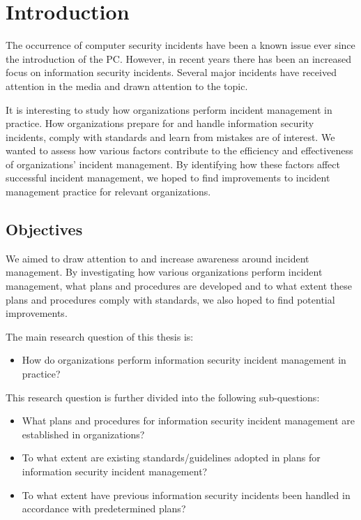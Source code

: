 \chapter{Introduction}
\label{chp:introduction}
The occurrence of computer security incidents have been a known issue ever since the introduction of the PC. However, in recent years there has been an increased focus on information security incidents. Several major incidents have received attention in the media and drawn attention to the topic. %

It is interesting to study how organizations perform incident management in practice. How organizations prepare for and handle information security incidents, comply with standards and learn from mistakes are of interest. We wanted to assess how various factors contribute to the efficiency and effectiveness of organizations' incident management. By identifying how these factors affect successful incident management, we hoped to find improvements to incident management practice for relevant organizations. 



\section{Objectives}
\label{sec:objectives}
We aimed to draw attention to and increase awareness around incident management. By investigating how various organizations perform incident management, what plans and procedures are developed and to what extent these plans and procedures comply with standards, we also hoped to find potential improvements.

The main research question of this thesis is:
\begin{itemize}
\item How do organizations perform information security incident management in practice?
\end{itemize}

This research question is further divided into the following sub-questions:

\begin{itemize}\itemsep-0.1cm
\item What plans and procedures for information security incident management are established in organizations?
\item To what extent are existing standards/guidelines adopted in plans for information security incident management?
\item To what extent have previous information security incidents been handled in accordance with predetermined plans? 
\end{itemize}

